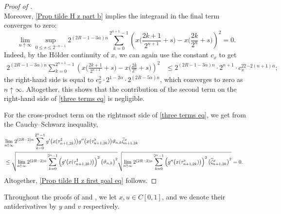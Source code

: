 \documentclass[12pt,reqno]{article}
\def\ua{\uparrow}
\def\wt{\widetilde}
\numberwithin{equation}{section}
\theoremstyle{definition}
\def\wt#1{\widetilde{#1}}
\def\ua{\uparrow}
\def\wt{\widetilde}
\begin{document}
\begin{proof}[Proof of ]
\begin{equation*}
	\end{equation*}
	Moreover, \ref{Prop tilde H z part b} implies the  integrand in the final term converges to zero:
	\begin{equation}\label{Prop tilde H z aux claim}
		\lim_{n\ua\infty}\sup_{0\le s\le 2^{-n-1}}2^{(2{R}-1-3\alpha)n}\sum_{k = 0}^{2^{n+1}-1}\left(x\Big(\frac{2k+1}{2^{n+1}}+s\Big)-x\Big(\frac{2k}{2^{n}}+s\Big)\right)^2=0.
	\end{equation}
	Indeed, by the H\"older continuity of $x$, we can again use the  constant $c_x$ to get 
	\begin{align*}
		2^{(2{R}-1-3\alpha)n}\sum_{k = 0}^{2^{n+1}-1}\left(x\Big(\frac{2k+1}{2^{n+1}}+s\Big)-x\Big(\frac{2k}{2^{n}}+s\Big)\right)^2&\le 2^{(2{R}-1-3\alpha)n}\cdot 2^{n+1}\cdot c_x^22^{-2(n+1)\alpha};
	\end{align*}
	the right-hand side is equal to $c_x^2\cdot2^{1-2\alpha}\cdot2^{(2{R}-5\alpha)n}$, which converges to zero as $n\ua\infty$. Altogether, this shows that the contribution of the second term on the right-hand side of \eqref{three terms eq} is negligible. 
	
	
	
	For the cross-product term on the rightmost side of \eqref{three terms eq}, we get from the Cauchy--Schwarz inequality, 
	\begin{equation*}
		\begin{split}
			\lefteqn{\lim_{n \ua \infty}2^{(2{R}-2)n}\sum_{k = 0}^{2^n-1}g'\big(x(\tau^\sharp_{n+1,2k})\big)g''\big(x(\tau^\flat_{n+1,2k})\big)\vartheta_{n,k}\wt\zeta^x_{n+1,2k}}
			\\&\le \sqrt{\lim_{n \ua \infty}2^{(2{R}-2)n}\sum_{k = 0}^{2^n-1}\left(g'\big(x(\tau^\sharp_{n+1,2k})\big)\right)^2\big(\vartheta_{n,k}\big)^2} \sqrt{\lim_{n \ua \infty}2^{(2{R}-2)n}\sum_{k = 0}^{2^n-1}\left(g''\big(x(\tau^\flat_{n+1,2k})\big)\right)^2\big(\wt\zeta^x_{n+1,2k}\big)^2} = 0.
		\end{split}
	\end{equation*}
	Altogether, \eqref{Prop tilde H z first goal eq} follows.\end{proof}

Throughout the proofs of  and , we let $x,u \in C[0,1]$, and we denote their antiderivatives by $y$ and $v$ respectively.
\end{document}
